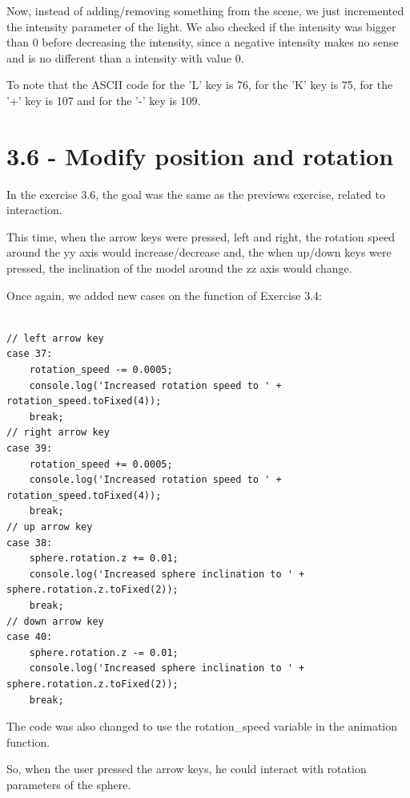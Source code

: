 \documentclass[12pt]{article}
\begin{document}
\noindent
Now, instead of adding/removing something from the scene, we just incremented the intensity parameter of the light. We also checked if the intensity was bigger than 0 before decreasing the intensity, since a negative intensity makes no sense and is no different than a intensity with value 0.

To note that the ASCII code for the 'L' key is 76, for the 'K' key is 75, for the '+' key is 107 and for the '-' key is 109. 

\section*{3.6 - Modify position and rotation}
\label{ex_36}

In the exercise 3.6, the goal was the same as the previews exercise, related to interaction.\par

This time, when the arrow keys were pressed, left and right, the rotation speed around the yy axis would increase/decrease and, the when up/down keys were pressed, the inclination of the model around the zz axis would change.\par

Once again, we added new cases on the function of Exercise 3.4:
\begin{lstlisting}

// left arrow key
case 37:
    rotation_speed -= 0.0005;
    console.log('Increased rotation speed to ' + rotation_speed.toFixed(4));
    break;
// right arrow key
case 39:
    rotation_speed += 0.0005;
    console.log('Increased rotation speed to ' + rotation_speed.toFixed(4));
    break;
// up arrow key
case 38:
    sphere.rotation.z += 0.01;
    console.log('Increased sphere inclination to ' + sphere.rotation.z.toFixed(2));
    break;
// down arrow key
case 40:
    sphere.rotation.z -= 0.01;
    console.log('Increased sphere inclination to ' + sphere.rotation.z.toFixed(2));
    break;

\end{lstlisting}

\noindent

The code was also changed to use the rotation\_speed variable in the animation function.

\noindent
So, when the user pressed the arrow keys, he could interact with rotation parameters of the sphere.

\end{document}
